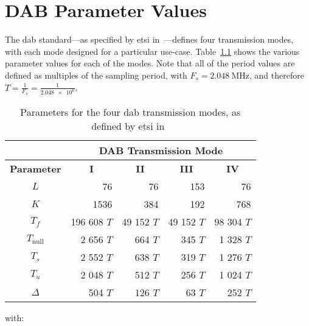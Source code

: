 \documentclass[class=report,11pt,crop=false]{standalone}
\begin{document}
\chapter{DAB Parameter Values \label{sect:dab-values_t-mode}}

The \gls{dab} standard---as specified by \gls{etsi} in~\cite{dabstandard}---defines four transmission modes, with each mode designed for a particular use-case. Table~\ref{tab:dab-parameters} shows the various parameter values for each of the modes. Note that all of the period values are defined as multiples of the sampling period, with \(F_s = \SI{2.048}{\mega\hertz}\), and therefore $T = \frac{1}{F_s} = \frac{1}{\num{2.048e6}}$.

{
\renewcommand{\arraystretch}{1.25}
\begin{table}[h]
    \centering
    \captionsetup{type=table}
    \begin{tabular}{c|r|r|r|r|}
    \cline{2-5}
     & \multicolumn{4}{c|}{\textbf{DAB Transmission Mode}} \\ \hline
    \multicolumn{1}{|c|}{\textbf{Parameter}} & \multicolumn{1}{c|}{\textbf{I}} & \multicolumn{1}{c|}{\textbf{II}} & \multicolumn{1}{c|}{\textbf{III}} & \multicolumn{1}{c|}{\textbf{IV}} \\ \hline
    \multicolumn{1}{|c|}{$L$} & 76 & 76 & 153 & 76 \\ \hline
    \multicolumn{1}{|c|}{$K$} & 1536 & 384 & 192 & 768 \\ \hline
    \multicolumn{1}{|c|}{$T_f$} & 196 608 $T$ & 49 152 $T$ & 49 152 $T$ & 98 304 $T$ \\ \hline
    \multicolumn{1}{|c|}{$T_\mathrm{null}$} & 2 656 $T$ & 664 $T$ & 345 $T$ & 1 328 $T$ \\ \hline
    \multicolumn{1}{|c|}{$T_s$} & 2 552 $T$ & 638 $T$ & 319 $T$ & 1 276 $T$ \\ \hline
    \multicolumn{1}{|c|}{$T_u$} & 2 048 $T$ & 512 $T$ & 256 $T$ & 1 024 $T$ \\ \hline
    \multicolumn{1}{|c|}{$\Delta$} & 504 $T$ & 126 $T$ & 63 $T$ & 252 $T$ \\ \hline
    \end{tabular}
    \caption{Parameters for the four \gls{dab} transmission modes, as defined by \gls{etsi} in~\cite{dabstandard}}
    \label{tab:dab-parameters}
    \end{table}
}
with:
\end{document}
